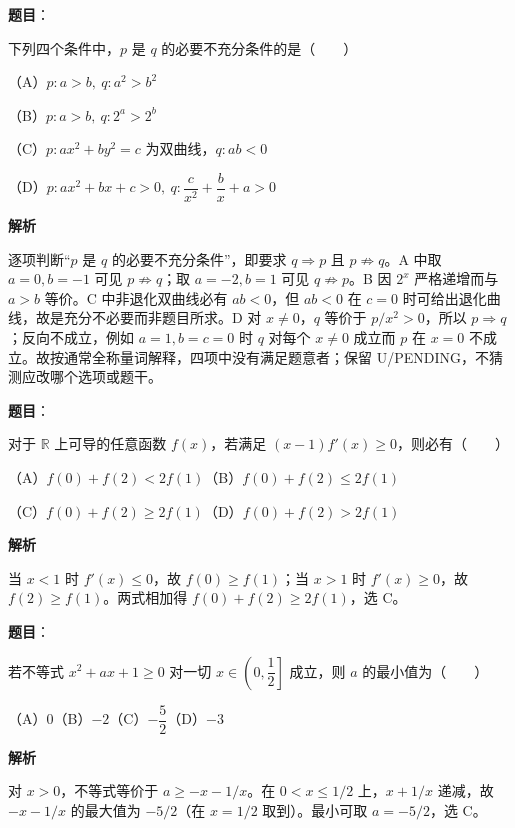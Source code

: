 \begin{answer}

\textbf{题目}：

下列四个条件中，$p$ 是 $q$ 的必要不充分条件的是\mbox{（　　）}

（A）$p:a>b,\ q:a^2>b^2$

（B）$p:a>b,\ q:2^a>2^b$

（C）$p:ax^2+by^2=c$ 为双曲线，$q:ab<0$

（D）$p:ax^2+bx+c>0,\ q:\dfrac{c}{x^2}+\dfrac{b}{x}+a>0$

\textbf{解析}

逐项判断“$p$ 是 $q$ 的必要不充分条件”，即要求 $q\Rightarrow p$ 且 $p\not\Rightarrow q$。A 中取 $a=0,b=-1$ 可见 $p\not\Rightarrow q$；取 $a=-2,b=1$ 可见 $q\not\Rightarrow p$。B 因 $2^x$ 严格递增而与 $a>b$ 等价。C 中非退化双曲线必有 $ab<0$，但 $ab<0$ 在 $c=0$ 时可给出退化曲线，故是充分不必要而非题目所求。D 对 $x\ne0$，$q$ 等价于 $p/x^2>0$，所以 $p\Rightarrow q$；反向不成立，例如 $a=1,b=c=0$ 时 $q$ 对每个 $x\ne0$ 成立而 $p$ 在 $x=0$ 不成立。故按通常全称量词解释，四项中没有满足题意者；保留 U/PENDING，不猜测应改哪个选项或题干。


\end{answer}
\begin{answer}

\textbf{题目}：

对于 $\mathbb R$ 上可导的任意函数 $f(x)$，若满足 $(x-1)f'(x)\geqslant0$，则必有\mbox{（　　）}

（A）$f(0)+f(2)<2f(1)$\quad（B）$f(0)+f(2)\leqslant2f(1)$

（C）$f(0)+f(2)\geqslant2f(1)$\quad（D）$f(0)+f(2)>2f(1)$

\textbf{解析}

当 $x<1$ 时 $f'(x)\le0$，故 $f(0)\ge f(1)$；当 $x>1$ 时 $f'(x)\ge0$，故 $f(2)\ge f(1)$。两式相加得 $f(0)+f(2)\ge2f(1)$，选 C。


\end{answer}
\begin{answer}

\textbf{题目}：

若不等式 $x^2+ax+1\geqslant0$ 对一切 $x\in\left(0,\dfrac12\right]$ 成立，则 $a$ 的最小值为\mbox{（　　）}

（A）$0$\quad（B）$-2$\quad（C）$-\dfrac52$\quad（D）$-3$

\textbf{解析}

对 $x>0$，不等式等价于 $a\ge -x-1/x$。在 $0<x\le1/2$ 上，$x+1/x$ 递减，故 $-x-1/x$ 的最大值为 $-5/2$（在 $x=1/2$ 取到）。最小可取 $a=-5/2$，选 C。


\end{answer}
